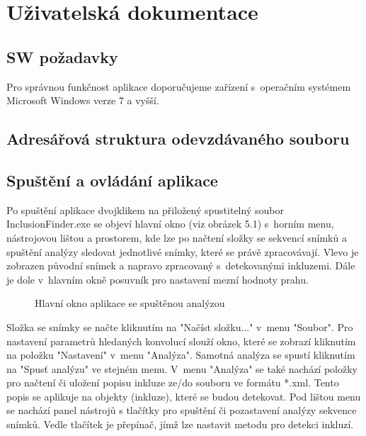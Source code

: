 \documentclass[12pt, a4paper]{report}
\begin{document}
\chapter{Uživatelská dokumentace}
	\section{SW požadavky}
	Pro správnou funkčnost aplikace doporučujeme zařízení s~operačním systémem Microsoft Windows verze 7 a vyšší.
	\section{Adresářová struktura odevzdávaného souboru}	
	
	\section{Spuštění a ovládání aplikace}	
Po spuštění aplikace dvojklikem na přiložený spustitelný soubor InclusionFinder.exe se objeví hlavní okno (viz obrázek 5.1) s~horním menu, nástrojovou lištou a prostorem, kde lze po načtení složky se sekvencí snímků a spuštění analýzy sledovat jednotlivé snímky, které se právě zpracovávají. Vlevo je zobrazen původní snímek a napravo zpracovaný s~detekovanými inkluzemi. Dále je dole v~hlavním okně posuvník pro nastavení mezní hodnoty prahu.

	\begin{figure}[!htb]
	\centering
	\label{fig:hlavni_okno}
	\caption{Hlavní okno aplikace se spuštěnou analýzou}
	\end{figure}

Složka se snímky se načte kliknutím na "Načíst složku..." v~menu "Soubor". Pro nastavení parametrů hledaných konvolucí slouží okno, které se zobrazí kliknutím na položku "Nastavení" v~menu "Analýza". Samotná analýza se spustí kliknutím na "Spusť analýzu" ve stejném menu. V~menu "Analýza" se také nachází položky pro načtení či uložení popisu inkluze ze/do souboru ve formátu *.xml. Tento popis se aplikuje na objekty (inkluze), které se budou detekovat. Pod lištou menu se nachází panel nástrojů s tlačítky pro spuštění či pozastavení analýzy sekvence snímků. Vedle tlačítek je přepínač, jímž lze nastavit metodu pro detekci inkluzí.
\end{document}
